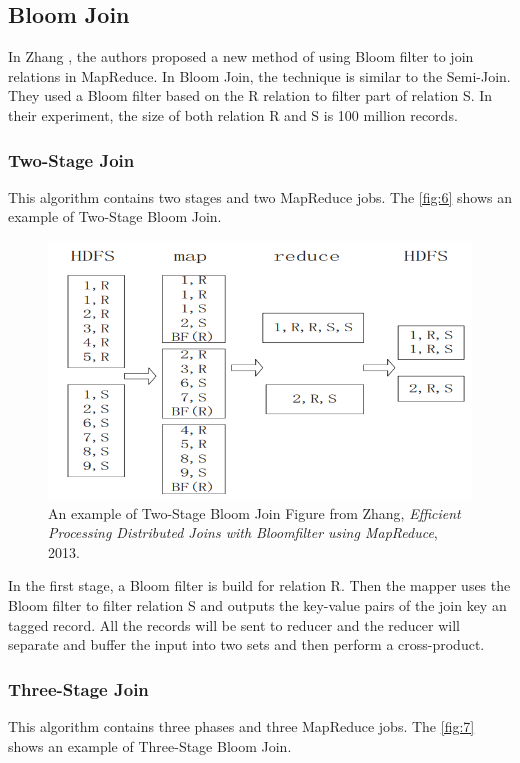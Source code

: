 \documentclass[sigconf, nonacm]{acmart}
\begin{document}
\subsection{Bloom Join}

In Zhang \cite{zhang2013efficient}, the authors proposed a new method of using Bloom filter to join relations in MapReduce. In Bloom Join, the technique is similar to the Semi-Join. They used a Bloom filter based on the R relation to filter part of relation S. In their experiment, the size of both relation R and S is 100 million records.

\subsubsection*{Two-Stage Join} This algorithm contains two stages and two MapReduce jobs. The \autoref{fig:6} shows an example of Two-Stage Bloom Join.

\begin{figure}[hbt!]
  \centering
  \includegraphics[width=\linewidth]{figures/6.png}
  \caption{An example of Two-Stage Bloom Join  Figure from Zhang, \textit{Efficient Processing Distributed Joins with Bloomfilter
using MapReduce}, 2013.}
  \label{fig:6}
\end{figure}

In the first stage, a Bloom filter is build for relation R. Then the mapper uses the Bloom filter to filter relation S and outputs the key-value pairs of the join key an tagged record. All the records will be sent to reducer and the reducer will separate and buffer the input into two sets and then perform a cross-product. 

\subsubsection*{Three-Stage Join} This algorithm contains three phases and three MapReduce jobs. The \autoref{fig:7} shows an example of Three-Stage Bloom Join.
\end{document}
